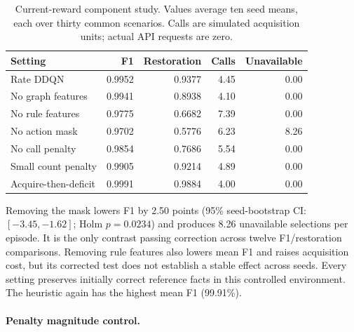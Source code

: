 \begin{table}[t]

\centering

\caption{Current-reward component study. Values average ten seed means, each over thirty common scenarios. Calls are simulated acquisition units; actual API requests are zero.}

\label{tab:rate_ablation}

\scriptsize

\begin{tabular}{lrrrr}

\toprule

Setting & F1 & Restoration & Calls & Unavailable \\

\midrule

Rate DDQN & 0.9952 & 0.9377 & 4.45 & 0.00 \\

No graph features & 0.9941 & 0.8938 & 4.10 & 0.00 \\

No rule features & 0.9775 & 0.6682 & 7.39 & 0.00 \\

No action mask & 0.9702 & 0.5776 & 6.23 & 8.26 \\

No call penalty & 0.9854 & 0.7686 & 5.54 & 0.00 \\

Small count penalty & 0.9905 & 0.9214 & 4.89 & 0.00 \\

Acquire-then-deficit & 0.9991 & 0.9884 & 4.00 & 0.00 \\

\bottomrule

\end{tabular}

\end{table}

Removing the mask lowers F1 by 2.50 points (95\% seed-bootstrap CI: $[-3.45,-1.62]$; Holm $p=0.0234$) and produces 8.26 unavailable selections per episode. It is the only contrast passing correction across twelve F1/restoration comparisons. Removing rule features also lowers mean F1 and raises acquisition cost, but its corrected test does not establish a stable effect across seeds. Every setting preserves initially correct reference facts in this controlled environment. The heuristic again has the highest mean F1 (99.91\%).

\paragraph{Penalty magnitude control.}

